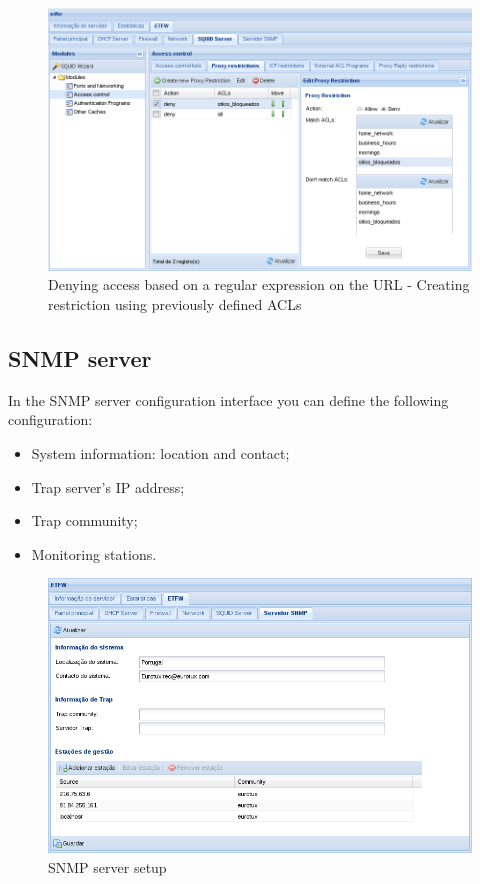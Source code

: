 \begin{figure}[H]
    \begin{center}
    \includegraphics[scale=0.38]{screenshots/etfw/etfw_squid_example_urlregexp_02.png}
    \caption{Denying access based on a regular expression on the URL - Creating restriction using previously defined ACLs}
    \label{fig:etfw_squid_example_urlregexp_02}
    \end{center}
\end{figure}

\subsection{SNMP server}

In the SNMP server configuration interface you can define the following configuration:

\begin{itemize}
    \item System information: location and contact;
    \item Trap server's IP address;
    \item Trap community;
    \item Monitoring stations.
\end{itemize}

\begin{figure}[H]
    \begin{center}
    \includegraphics[scale=0.38]{screenshots/etfw/etfw_snmp_01.png}
    \caption{SNMP server setup}
    \label{fig:etfw_smp_01}
    \end{center}
\end{figure}

